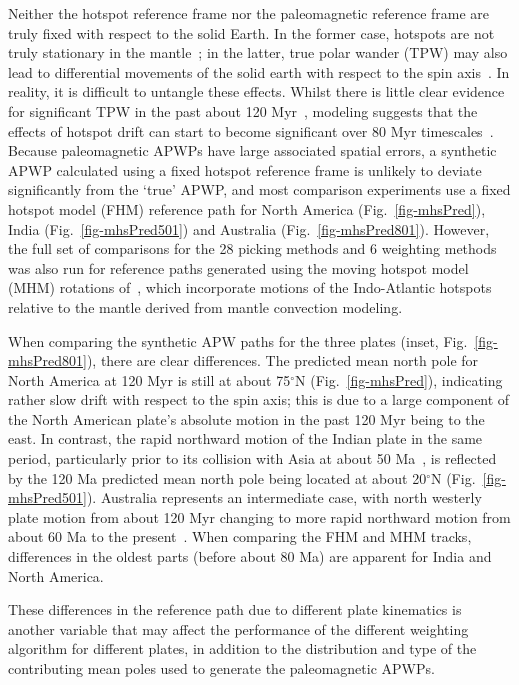 Neither the hotspot reference frame nor the paleomagnetic reference frame are
truly fixed with respect to the solid Earth. In the former case, hotspots are
not truly stationary in the mantle~\cite{S98}; in the latter, true polar wander
(TPW) may also lead to differential movements of the solid earth with respect to
the spin axis~\cite{E03}. In reality, it is difficult to untangle these effects.
Whilst there is little clear evidence for significant TPW in the past about 120
Myr~\cite{C00,R04}, modeling suggests that the effects of hotspot drift can
start to become significant over 80 Myr timescales~\cite{O05}.
Because paleomagnetic APWPs have large associated spatial errors, a synthetic
APWP calculated using a fixed hotspot reference frame is unlikely to deviate
significantly from the `true' APWP, and most comparison experiments use a fixed
hotspot model (FHM) reference path for North America (Fig.~\ref{fig-mhsPred}),
India (Fig.~\ref{fig-mhsPred501}) and Australia (Fig.~\ref{fig-mhsPred801}).
However, the full set of comparisons for the 28 picking methods and 6 weighting
methods was also run for reference paths generated using the moving hotspot
model (MHM) rotations of~\cite{O05}, which incorporate motions of the
Indo-Atlantic hotspots relative to the mantle derived from mantle convection
modeling.

When comparing the synthetic APW paths for the three plates (inset,
Fig.~\ref{fig-mhsPred801}), there are clear differences. The predicted mean
north pole for North America at 120 Myr is still at about 75$^{\circ}$N
(Fig.~\ref{fig-mhsPred}), indicating rather slow drift with respect to the spin
axis; this is due to a large component of the North American plate's absolute
motion in the past 120 Myr being to the east. In contrast, the rapid northward
motion of the Indian plate in the same period, particularly prior to its
collision with Asia at about 50 Ma~\cite{N10}, is reflected by the
120 Ma predicted mean north pole being located at about 20$^{\circ}$N
(Fig.~\ref{fig-mhsPred501}). Australia represents an intermediate case, with
north westerly plate motion from about 120 Myr changing to more
rapid northward motion from about 60 Ma to the present~\cite{W07}.
When comparing the FHM and MHM tracks, differences in the oldest parts (before
about 80 Ma) are apparent for India and North America.

These differences in the reference path due to different plate kinematics is
another variable that may affect the performance of the different weighting
algorithm for different plates, in addition to the distribution and type of the
contributing mean poles used to generate the paleomagnetic APWPs.

